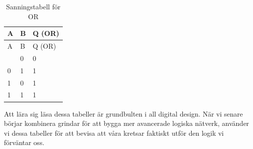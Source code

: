 \documentclass[
  swedish,
  letterpaper,
  oneside,
  openany]{book}
\begin{document}
\begin{longtable}[]{@{}lll@{}}
\caption{Sanningstabell för OR}\label{tbl-or}\tabularnewline
\toprule\noalign{}
A & B & Q (OR) \\
\midrule\noalign{}
\endfirsthead
\toprule\noalign{}
A & B & Q (OR) \\
\midrule\noalign{}
\endhead
\bottomrule\noalign{}
\endlastfoot
0 & 0 & 0 \\
0 & 1 & 1 \\
1 & 0 & 1 \\
1 & 1 & 1 \\
\end{longtable}

Att lära sig läsa dessa tabeller är grundbulten i all digital design.
När vi senare börjar kombinera grindar för att bygga mer avancerade
logiska nätverk, använder vi dessa tabeller för att bevisa att våra
kretsar faktiskt utför den logik vi förväntar oss.
\end{document}
